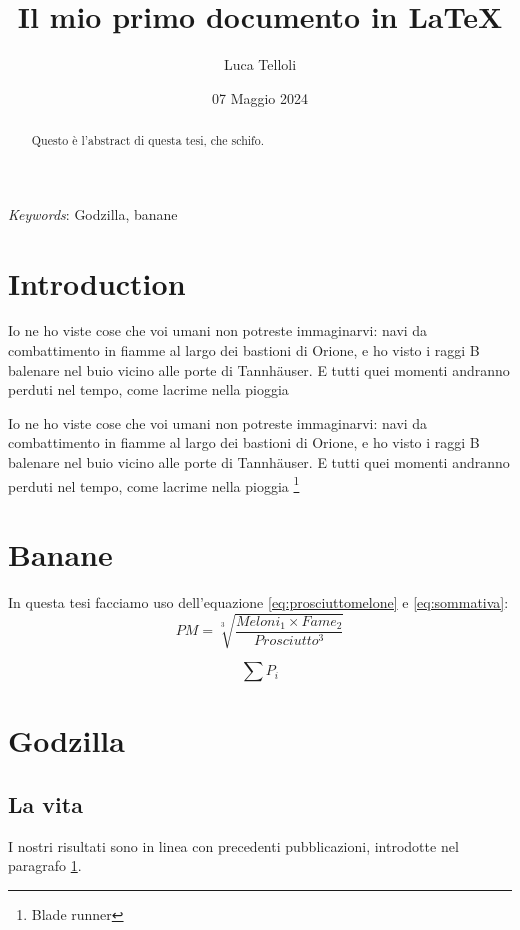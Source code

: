 \documentclass[12pt]{article}
\title{Il mio primo documento in LaTeX}
\author{Luca Telloli}
\date{07 Maggio 2024}
\begin{document}
\maketitle

\begin{abstract}
    Questo è l'abstract di questa tesi, che schifo.
\end{abstract}

\textit{Keywords}: Godzilla, banane

\tableofcontents

\section{Introduction}


\label{sec:intro}
Io ne ho viste cose che voi umani non potreste immaginarvi:
navi da combattimento in fiamme al largo dei bastioni di Orione,
e ho visto i raggi B balenare nel buio vicino alle porte di Tannhäuser.
E tutti quei momenti andranno perduti nel tempo,
come lacrime nella pioggia \cite{Zuckerman2024}

Io ne ho viste cose che voi umani non potreste immaginarvi:
navi da combattimento in fiamme al largo dei bastioni di Orione,
e ho visto i raggi B balenare nel buio vicino alle porte di Tannhäuser.
E tutti quei momenti andranno perduti nel tempo,
come lacrime nella pioggia \cite{Rubsam2024}
\footnote{Blade runner}


\section{Banane}
In questa tesi facciamo uso dell'equazione \ref{eq:prosciuttomelone} e \ref{eq:sommativa}:
\begin{equation}
    PM = \sqrt[3]{\frac{Meloni_1 \times Fame_2}{Prosciutto^3}}
    \label{eq:prosciuttomelone}
\end{equation}

\begin{equation}
    \sum P_i
    \label{eq:sommativa}
\end{equation}

\section{Godzilla}
\subsection{La vita}
I nostri risultati sono in linea con precedenti pubblicazioni, introdotte nel paragrafo \ref{sec:intro}.
\end{document}
